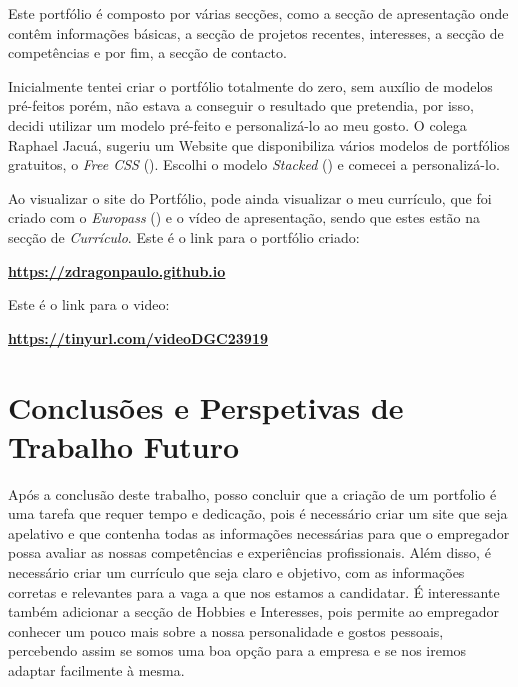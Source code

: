 \documentclass[a4paper]{article}
\begin{document}
Este portfólio é composto por várias secções, como a secção de apresentação onde contêm informações básicas, a secção de projetos recentes, 
interesses, a secção de competências e por fim, a secção de contacto.

Inicialmente tentei criar o portfólio totalmente do zero, sem auxílio de modelos pré-feitos porém, não estava a conseguir o resultado que pretendia,
por isso, decidi utilizar um modelo pré-feito e personalizá-lo ao meu gosto. O colega Raphael Jacuá, sugeriu um Website que disponibiliza vários 
modelos de portfólios gratuitos, o \textit{Free CSS} (\cite{freecss}). Escolhi o modelo \textit{Stacked} (\cite{stacked}) 
e comecei a personalizá-lo.

Ao visualizar o site do Portfólio, pode ainda visualizar o meu currículo, que foi criado com o \textit{Europass} (\cite{europass}) e o vídeo de apresentação, 
sendo que estes estão na secção de \textit{Currículo}.
Este é o link para o portfólio criado: \\
\begin{center} 
    { \large \textbf{\url{https://zdragonpaulo.github.io}}}
\end{center}
Este é o link para o video: \\
\begin{center} 
    { \large \textbf{\url{https://tinyurl.com/videoDGC23919}}}
\end{center}


\newpage
\section{Conclusões e Perspetivas de Trabalho Futuro}\label{con}
Após a conclusão deste trabalho, posso concluir que a criação de um portfolio é uma tarefa que requer tempo e dedicação,
pois é necessário criar um site que seja apelativo e que contenha todas as informações necessárias para que o empregador possa
avaliar as nossas competências e experiências profissionais. Além disso, é necessário criar um currículo que seja claro e objetivo,
com as informações corretas e relevantes para a vaga a que nos estamos a candidatar. É interessante também adicionar a secção de 
Hobbies e Interesses, pois permite ao empregador conhecer um pouco mais sobre a nossa personalidade e gostos pessoais, percebendo 
assim se somos uma boa opção para a empresa e se nos iremos adaptar facilmente à mesma.

\newpage
{}
\printbibliography
\end{document}
